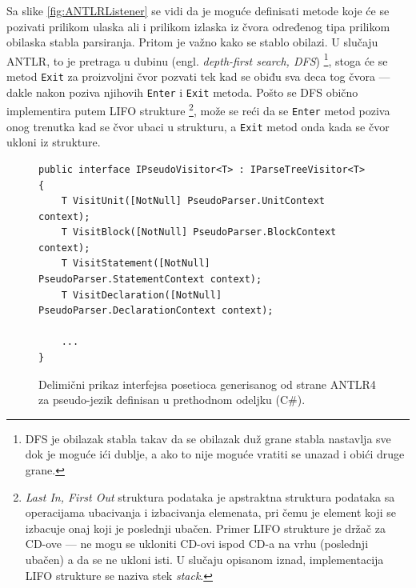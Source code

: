 Sa slike \ref{fig:ANTLRListener} se vidi da je moguće definisati metode koje će se pozivati prilikom ulaska ali i prilikom izlaska iz čvora određenog tipa prilikom obilaska stabla parsiranja. Pritom je važno kako se stablo obilazi. U slučaju ANTLR, to je pretraga u dubinu (engl. \emph{depth-first search, DFS}) \footnote{DFS je obilazak stabla takav da se obilazak duž grane stabla nastavlja sve dok je moguće ići dublje, a ako to nije moguće vratiti se unazad i obići druge grane.}, stoga će se metod \texttt{Exit} za proizvoljni čvor pozvati tek kad se obiđu sva deca tog čvora --- dakle nakon poziva njihovih \texttt{Enter} i \texttt{Exit} metoda. Pošto se DFS obično implementira putem LIFO strukture \footnote{\emph{Last In, First Out} struktura podataka je apstraktna struktura podataka sa operacijama ubacivanja i izbacivanja elemenata, pri čemu je element koji se izbacuje onaj koji je poslednji ubačen. Primer LIFO strukture je držač za CD-ove --- ne mogu se ukloniti CD-ovi ispod CD-a na vrhu (poslednji ubačen) a da se ne ukloni isti. U slučaju opisanom iznad, implementacija LIFO strukture se naziva stek \emph{stack}.}, može se reći da se \texttt{Enter} metod poziva onog trenutka kad se čvor ubaci u strukturu, a \texttt{Exit} metod onda kada se čvor ukloni iz strukture.

\begin{figure}[h!]
\begin{lstlisting}
public interface IPseudoVisitor<T> : IParseTreeVisitor<T>
{
    T VisitUnit([NotNull] PseudoParser.UnitContext context);
    T VisitBlock([NotNull] PseudoParser.BlockContext context);
    T VisitStatement([NotNull] PseudoParser.StatementContext context);
    T VisitDeclaration([NotNull] PseudoParser.DeclarationContext context);
    
    ...
}
\end{lstlisting}
\caption{Delimični prikaz interfejsa posetioca generisanog od strane ANTLR4 za pseudo-jezik definisan u prethodnom odeljku (C\#).}
\label{fig:ANTLRVisitor}
\end{figure}

